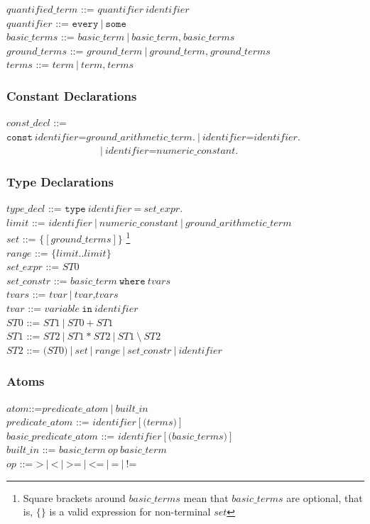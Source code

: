 \documentclass[a4paper,10pt]{article}
\begin{document}
\noindent
$quantified\_term$ ::= $quantifier~identifier$\\
$quantifier$ ::= $\texttt{every}~|~\texttt{some}$ \\
$basic\_terms$ ::= $basic\_term~|~basic\_term\texttt{,} ~basic\_terms$ \\
$ground\_terms$ ::= $ground\_term~|~ground\_term\texttt{,} ~ground\_terms$ \\
$terms$ ::= $term~|~term\texttt{,}~ terms$ \\

\subsubsection{Constant Declarations}
$const\_decl$ ::= $\texttt{const} ~identifier \texttt{=} ground\_arithmetic\_term.~|~identifier \texttt{=} identifier.~$\\
~~~~~~~~~~$~~~~~~~~~~~~~~~~~~~~|~identifier \texttt{=} numeric\_constant.$
\subsubsection{Type Declarations}

$type\_decl$ ::= $\texttt{type}~identifier~ \texttt{=} ~set\_expr.$\\
$limit$ ::= $identifier~|~numeric\_constant~|~ground\_arithmetic\_term$\\
$set$ ::= $\texttt{\{} [ground\_terms] \texttt{\}}$ \footnote{Square brackets around $basic\_terms$ mean that $basic\_terms$ are optional, that is, $\{ \}$  is a valid expression for non-terminal $set$}\\
$range$ ::= $\texttt{\{}limit..limit\texttt{\}}$\\
$set\_expr$ ::= $ST0$ \\  
$set\_constr$ ::= $basic\_term~\texttt{where}~tvars $\\
$tvars$ ::= $tvar~|~tvar\texttt{,} tvars$\\
$tvar$ ::= $variable~\texttt{in}~identifier$  \\
$ST0$ ::= $ST1~|~ST0~\texttt{+}~ST1$\\
$ST1$ ::= $ST2~|~ST1~\texttt{*}~ST2~|~ST1~\texttt{\textbackslash}~ST2$ \\
$ST2$ ::= $\texttt{(}ST0\texttt{)}~|~set~|~range~|~set\_constr~|~identifier$  \\


\subsubsection{Atoms}
$atom$::=$predicate\_atom~|~built\_in $\\
$predicate\_atom$ ::= $identifier [\texttt{(} terms \texttt{)}]$\\
$basic\_predicate\_atom$ ::= $identifier [\texttt{(} basic\_terms \texttt{)}]$\\
$built\_in$ ::= $ basic\_term~op~basic\_term$\\
$op$ ::= $\texttt{>}~|~\texttt{<}~|~\texttt{>=}~|~\texttt{<=}~|~\texttt{=}~|~\texttt{!=}$ \\
\end{document}
